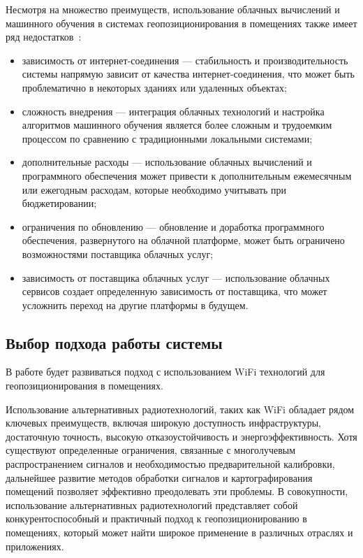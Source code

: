 Несмотря на множество преимуществ, использование облачных вычислений и машинного обучения в системах геопозиционирования в помещениях также имеет ряд недостатков~\cite{cloudML}:

\begin{itemize}[label=---]
    \item зависимость от интернет-соединения --- стабильность и производительность системы напрямую зависит от качества интернет-соединения, что может быть проблематично в некоторых зданиях или удаленных объектах;
    \item сложность внедрения --- интеграция облачных технологий и настройка алгоритмов машинного обучения является более сложным и трудоемким процессом по сравнению с традиционными локальными системами;
    \item дополнительные расходы --- использование облачных вычислений и программного обеспечения может привести к дополнительным ежемесячным или ежегодным расходам, которые необходимо учитывать при бюджетировании;
    \item ограничения по обновлению --- обновление и доработка программного обеспечения, развернутого на облачной платформе, может быть ограничено возможностями поставщика облачных услуг;
    \item зависимость от поставщика облачных услуг --- использование облачных сервисов создает определенную зависимость от поставщика, что может усложнить переход на другие платформы в будущем.
\end{itemize}

\subsection{Выбор подхода работы системы}

В работе будет развиваться подход с использованием WiFi технологий для геопозиционирования в помещениях.

Использование альтернативных радиотехнологий, таких как WiFi обладает рядом ключевых преимуществ, включая широкую доступность инфраструктуры, достаточную точность, высокую отказоустойчивость и энергоэффективность. Хотя существуют определенные ограничения, связанные с многолучевым распространением сигналов и необходимостью предварительной калибровки, дальнейшее развитие методов обработки сигналов и картографирования помещений позволяет эффективно преодолевать эти проблемы. В совокупности, использование альтернативных радиотехнологий представляет собой конкурентоспособный и практичный подход к геопозиционированию в помещениях, который может найти широкое применение в различных отраслях и приложениях.

